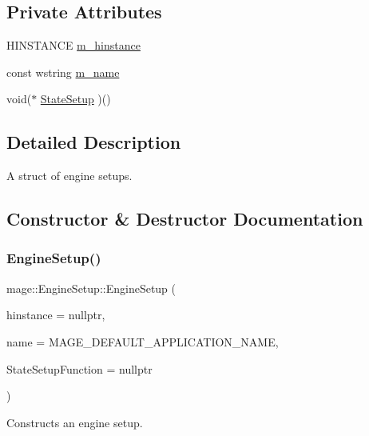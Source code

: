 \subsection*{Private Attributes}
\begin{DoxyCompactItemize}
\item 
H\+I\+N\+S\+T\+A\+N\+CE \hyperlink{structmage_1_1_engine_setup_af91461305cd9aa60e22fa770395d2238}{m\+\_\+hinstance}
\item 
const wstring \hyperlink{structmage_1_1_engine_setup_a40fba981d4b1c30eff304b029a013009}{m\+\_\+name}
\item 
void($\ast$ \hyperlink{structmage_1_1_engine_setup_a36a3c8a316c63e6c90ee9dd6efb82c0c}{State\+Setup} )()
\end{DoxyCompactItemize}


\subsection{Detailed Description}
A struct of engine setups. 

\subsection{Constructor \& Destructor Documentation}
\hypertarget{structmage_1_1_engine_setup_a926d9b0e6aa2d1e57d0c2bc2ca46a885}{}\label{structmage_1_1_engine_setup_a926d9b0e6aa2d1e57d0c2bc2ca46a885} 
\subsubsection{\texorpdfstring{Engine\+Setup()}{EngineSetup()}\hspace{0.1cm}{\footnotesize\ttfamily [1/2]}}
{\footnotesize\ttfamily mage\+::\+Engine\+Setup\+::\+Engine\+Setup (\begin{DoxyParamCaption}\item[{H\+I\+N\+S\+T\+A\+N\+CE}]{hinstance = {\ttfamily nullptr},  }\item[{const wstring \&}]{name = {\ttfamily MAGE\+\_\+DEFAULT\+\_\+APPLICATION\+\_\+NAME},  }\item[{void($\ast$)()}]{State\+Setup\+Function = {\ttfamily nullptr} }\end{DoxyParamCaption})}

Constructs an engine setup.


